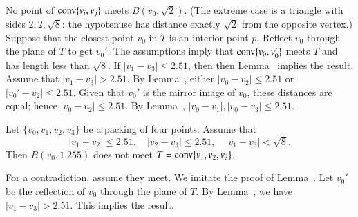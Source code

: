 \begin{tarskidata}
\begin{tarski}
\begin{proved}
No point of ${\operatorname{conv}}\{v_i,v_j\}$ meets $B(v_0,\sqrt2)$.  (The
extreme case is a triangle with sides $2,2,\sqrt8$: the hypotenuse
has distance exactly $\sqrt2$ from the opposite vertex.)
Suppose that the closest point $v_0$ in
$T$ is an interior point $p$. Reflect $v_0$
through the plane of $T$ to get $v_0'$. The assumptions imply
that ${\operatorname{conv}}\{v_0,v_0'\}$ meets $T$ and has
length less than $\sqrt8$. If $|v_1-v_3|\le2.51$, then
then Lemma~ implies the result.
Assume that $|v_1-v_3|>2.51$.
By Lemma~,  
either $|v_0-v_2|\le2.51$ or $|v_0'-v_2|\le 2.51$.  Given that
$v_0'$ is the mirror image of $v_0$, these distances are equal;
hence $|v_0-v_2|\le 2.51$.  By Lemma~,
$|v_0-v_1|,|v_0-v_3|\le 2.51$.
\swallowed\end{proved}
\end{tarski}


\begin{tarski}

\begin{lemma}
Let $\{v_0,v_1,v_2,v_3\}$ be a packing of four points. Assume that
$$
   |v_1-v_2|\le 2.51,\quad |v_2-v_3|\le 2.51,\quad |v_1-v_3|<\sqrt8.
$$
Then $B(v_0,1.255)$ does not meet $T={\operatorname{conv}}\{v_1,v_2,v_3\}$.
\end{lemma}


\begin{proved}   For a contradiction, assume they meet. 
We imitate the proof of Lemma~.
Let $v_0'$ be the reflection of $v_0$ through the plane of $T$.
By
Lemma~, we have $|v_1-v_3|>2.51$.
This implies the result.
\swallowed\end{proved}
\end{tarski}














\end{tarskidata}
